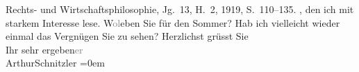 \begin{ledgroupsized}[t]{13cm}
{{{{                                Rechts- und Wirtschaftsphilosophie}, Jg. 13, H. 2,
                                1919, S. 110–135. }}}\label{K_L02341_1h}, den ich mit starkem Interesse lese.\pend
           \pstart
           W\textcolor{gray}{o}\textcolor{gray}{l}eben Sie für den Sommer? Hab ich vielleicht wieder einmal
                    das Vergnügen Sie zu sehen?\pend
           \pstart
           Herzlichst grüsst Sie{\\[\baselineskip]}Ihr sehr ergeben\textcolor{gray}{er}{\\[\baselineskip]}\spacefill\mbox{ArthurSchnitzler}\pend
           \leftskip=0em{}\endnumbering{}\end{ledgroupsized}  \newcommand{\dateiname}{L02341}\newcommand{\titel}{Arthur Schnitzler an Robert Adam, 12. 6. 1920}\newcommand{\editorInnen}{Martin Anton Müller und Gerd-Hermann Susen}
      